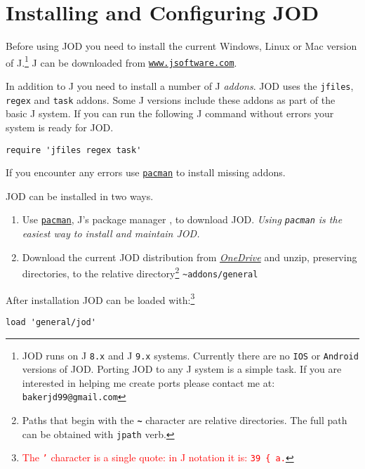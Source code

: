 \section{Installing and Configuring JOD}\label{ss:jodcfgdesc}

Before using JOD you need to install the current Windows, Linux or Mac version of J.\footnote{JOD runs on 
 J \texttt{8.x} and J \texttt{9.x} systems. Currently there are no \texttt{IOS} or \texttt{Android} versions of JOD. Porting JOD 
to any J system is a simple task.
If you are interested in helping me create ports please contact me at:  
\texttt{bakerjd99@gmail.com}
} J can be downloaded from \href{https://www.jsoftware.com}{\texttt{www.jsoftware.com}}.

In addition to J you need to install a number of J \emph{addons}. JOD uses the
\texttt{jfiles}, \texttt{regex} and \texttt{task} addons.  Some J versions
include these addons as part of the basic J system. If you can run the following J command
without errors your system is ready for JOD. 
\begin{lstlisting}[frame=single,framerule=0pt,label=lst:reqaddons]
   require 'jfiles regex task'
\end{lstlisting}
If you encounter any errors  use \href{https://code.jsoftware.com/wiki/Pacman}{\texttt{pacman}} to install 
missing addons.
 
JOD can be installed in two ways.  
\begin{enumerate}
	\item Use \href{https://code.jsoftware.com/wiki/Pacman}{\texttt{pacman}}, J's package manager 
	\cite{jwiki:pacman}, to download JOD. \emph{Using \texttt{pacman} is the easiest way to install and maintain JOD.}
	\item Download the current JOD distribution from \href{https://1drv.ms/f/s!AhkVADYOM2T54yK3-aY3vCrtk89p?e=WoQiHg}{\emph{OneDrive}} and unzip, preserving directories, to the relative directory\footnote{Paths that begin with the \textbf{\texttt{\~}} character are relative directories. The full path can be obtained with \texttt{jpath} verb. } \verb|~addons/general|
\end{enumerate}

After installation JOD can be loaded with:\footnote{\textcolor{red}{The \texttt{'} character 
is a single quote: in J notation it is: \texttt{39 \{ a.}}
}
\begin{lstlisting}[frame=single,framerule=0pt,label=lst:loadjod00]
   load 'general/jod'
\end{lstlisting}

